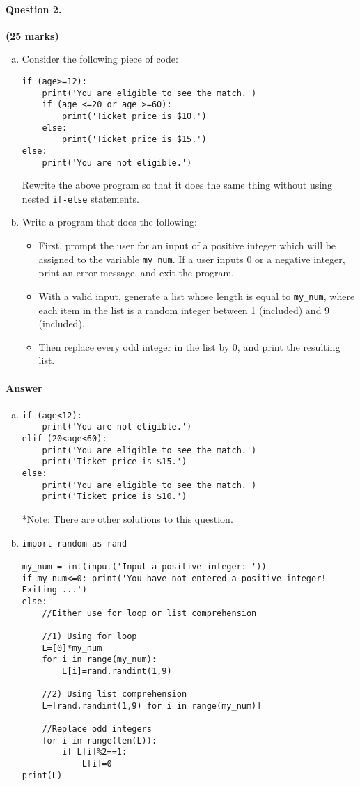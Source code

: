 \documentclass[12pt]{article}
\begin{document}
\paragraph{Question 2.} \hfill {\bf (25 marks)}
\begin{enumerate}[(a)]
\item Consider the following piece of code:
\begin{verbatim}
if (age>=12):
    print('You are eligible to see the match.')
    if (age <=20 or age >=60):
        print('Ticket price is $10.')
    else:
        print('Ticket price is $15.')
else:
    print('You are not eligible.')
\end{verbatim}
Rewrite the above program so that it does the same thing without using nested \verb|if-else| statements.
\item Write a program that does the following:
\begin{itemize}
\item First, prompt the user for an input of a positive integer which will be assigned to the variable \verb|my_num|. If a user inputs $0$ or a negative integer, print an error message, and exit the program.
\item With a valid input, generate a list whose length is equal to \verb|my_num|, where each item in the list is a random integer between 1 (included) and 9 (included).
\item Then replace every odd integer in the list by 0, and print the resulting list.
\end{itemize}
\end{enumerate}
\paragraph{Answer}
\begin{enumerate}[(a)]
\item \begin{verbatim}
if (age<12):
    print('You are not eligible.')
elif (20<age<60):
    print('You are eligible to see the match.')
    print('Ticket price is $15.')
else:
    print('You are eligible to see the match.')
    print('Ticket price is $10.')
\end{verbatim}
*Note: There are other solutions to this question.
\item \begin{verbatim}
import random as rand

my_num = int(input('Input a positive integer: '))
if my_num<=0: print('You have not entered a positive integer! Exiting ...')
else:
    //Either use for loop or list comprehension
	
    //1) Using for loop
    L=[0]*my_num
    for i in range(my_num):
        L[i]=rand.randint(1,9)
    
    //2) Using list comprehension
    L=[rand.randint(1,9) for i in range(my_num)]
    
    //Replace odd integers
    for i in range(len(L)):
        if L[i]%2==1:
            L[i]=0
print(L)
\end{verbatim}
\end{enumerate}\clearpage
\end{document}
